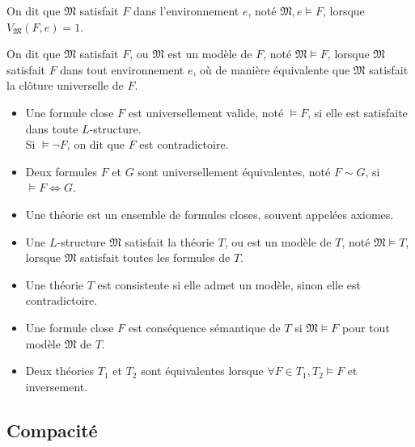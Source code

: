 \documentclass[9pt]{beamer}
\begin{document}
\begin{frame}
\begin{definition}
  On dit que $\mathfrak{M}$ satisfait $F$ dans l'environnement $e$, noté $\mathfrak{M},e \models F$, lorsque $V_{\mathfrak{M}}(F,e) = 1$.

  On dit que $\mathfrak{M}$ satisfait $F$, ou $\mathfrak{M}$ est un modèle de $F$, noté $\mathfrak{M} \models F$, lorsque $\mathfrak{M}$ satisfait $F$ dans tout environnement $e$, où de manière équivalente que $\mathfrak{M}$ satisfait la clôture universelle de $F$.
\end{definition}
\end{frame}

\begin{frame}
\begin{definition}
  \begin{itemize}
  \item Une formule close $F$ est universellement valide, noté $\models F$, si elle est satisfaite dans toute $L$-structure.\\
    Si $\models\neg F$, on dit que $F$ est contradictoire.
  \item Deux formules $F$ et $G$ sont universellement équivalentes, noté $F \sim G$, si $\models F \Leftrightarrow G$.
  \item Une théorie est un ensemble de formules closes, souvent appelées axiomes.
  \item Une $L$-structure $\mathfrak{M}$ satisfait la théorie $T$, ou est un modèle de $T$, noté $\mathfrak{M} \models T$, lorsque $\mathfrak{M}$ satisfait toutes les formules de $T$.
  \item Une théorie $T$ est consistente si elle admet un modèle, sinon elle est contradictoire.
  \item Une formule close $F$ est conséquence sémantique de $T$ si $\mathfrak{M} \models F$ pour tout modèle $\mathfrak{M}$ de $T$.
  \item Deux théories $T_1$ et $T_2$ sont équivalentes lorsque $\forall F \in T_1, T_2 \models F$ et inversement.
  \end{itemize}
\end{definition}
\end{frame}

\subsection{Compacité}
\end{document}
